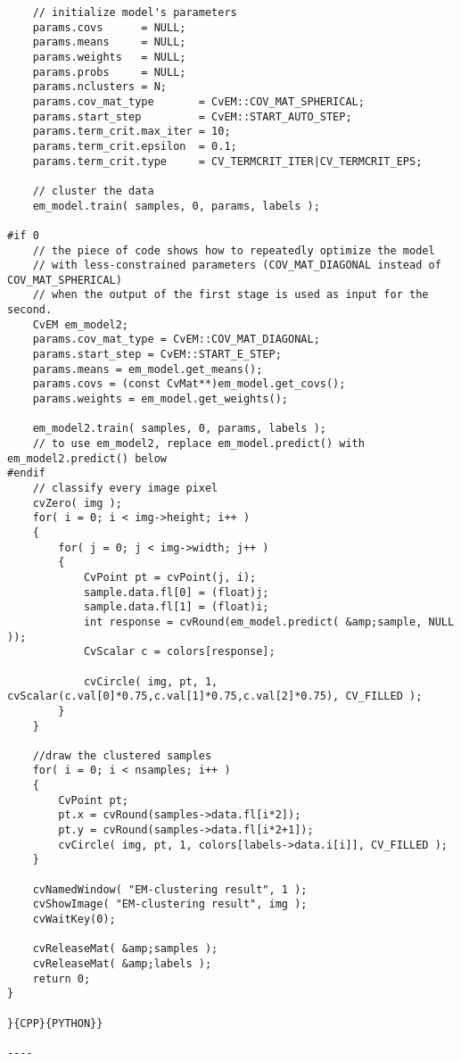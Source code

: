 \begin{verbatim}
    // initialize model's parameters
    params.covs      = NULL;
    params.means     = NULL;
    params.weights   = NULL;
    params.probs     = NULL;
    params.nclusters = N;
    params.cov_mat_type       = CvEM::COV_MAT_SPHERICAL;
    params.start_step         = CvEM::START_AUTO_STEP;
    params.term_crit.max_iter = 10;
    params.term_crit.epsilon  = 0.1;
    params.term_crit.type     = CV_TERMCRIT_ITER|CV_TERMCRIT_EPS;

    // cluster the data
    em_model.train( samples, 0, params, labels );

#if 0
    // the piece of code shows how to repeatedly optimize the model
    // with less-constrained parameters (COV_MAT_DIAGONAL instead of COV_MAT_SPHERICAL)
    // when the output of the first stage is used as input for the second.
    CvEM em_model2;
    params.cov_mat_type = CvEM::COV_MAT_DIAGONAL;
    params.start_step = CvEM::START_E_STEP;
    params.means = em_model.get_means();
    params.covs = (const CvMat**)em_model.get_covs();
    params.weights = em_model.get_weights();

    em_model2.train( samples, 0, params, labels );
    // to use em_model2, replace em_model.predict() with em_model2.predict() below
#endif
    // classify every image pixel
    cvZero( img );
    for( i = 0; i < img->height; i++ )
    {
        for( j = 0; j < img->width; j++ )
        {
            CvPoint pt = cvPoint(j, i);
            sample.data.fl[0] = (float)j;
            sample.data.fl[1] = (float)i;
            int response = cvRound(em_model.predict( &amp;sample, NULL ));
            CvScalar c = colors[response];

            cvCircle( img, pt, 1, cvScalar(c.val[0]*0.75,c.val[1]*0.75,c.val[2]*0.75), CV_FILLED );
        }
    }

    //draw the clustered samples
    for( i = 0; i < nsamples; i++ )
    {
        CvPoint pt;
        pt.x = cvRound(samples->data.fl[i*2]);
        pt.y = cvRound(samples->data.fl[i*2+1]);
        cvCircle( img, pt, 1, colors[labels->data.i[i]], CV_FILLED );
    }

    cvNamedWindow( "EM-clustering result", 1 );
    cvShowImage( "EM-clustering result", img );
    cvWaitKey(0);

    cvReleaseMat( &amp;samples );
    cvReleaseMat( &amp;labels );
    return 0;
}

}{CPP}{PYTHON}}

----

\end{verbatim}
